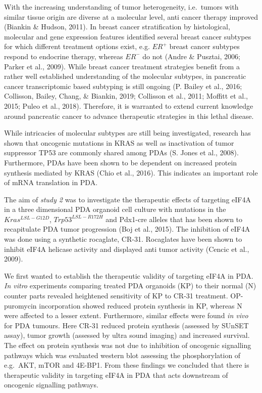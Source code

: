 \documentclass[12pt,openany]{book}
\begin{document}
With the increasing understanding of tumor heterogeneity, i.e.~tumors
with similar tissue origin are diverse at a molecular level, anti cancer
therapy improved (Biankin \& Hudson, 2011). In breast cancer
stratification by histological, molecular and gene expression features
identified several breast cancer subtypes for which different treatment
options exist, e.g. \(ER^+\) breast cancer subtypes respond to endocrine
therapy, whereas \(ER^-\) do not (Andre \& Pusztai, 2006; Parker et al.,
2009). While breast cancer treatment strategies benefit from a rather
well established understanding of the molecular subtypes, in pancreatic
cancer transcriptomic based subtyping is still ongoing (P. Bailey et
al., 2016; Collisson, Bailey, Chang, \& Biankin, 2019; Collisson et al.,
2011; Moffitt et al., 2015; Puleo et al., 2018). Therefore, it is
warranted to extend current knowledge around pancreatic cancer to
advance therapeutic strategies in this lethal disease.

While intricacies of molecular subtypes are still being investigated,
research has shown that oncogenic mutations in KRAS as well as
inactivation of tumor suppressor TP53 are commonly shared among PDAs (S.
Jones et al., 2008). Furthermore, PDAs have been shown to be dependent
on increased protein synthesis mediated by KRAS (Chio et al., 2016).
This indicates an important role of mRNA translation in PDA.

The aim of \emph{study 2} was to investigate the therapeutic effects of
targeting eIF4A in a three dimensional PDA organoid cell culture with
mutations in the \(Kras^{LSL-G12D}\), \(Trp53^{LSL-R172H}\) and Pdx1-cre
alleles that has been shown to recapitulate PDA tumor progression (Boj
et al., 2015). The inhibition of eIF4A was done using a synthetic
rocaglate, CR-31. Rocaglates have been shown to inhibit eIF4A helicase
activity and displayed anti tumor activity (Cencic et al., 2009).

We first wanted to establish the therapeutic validity of targeting eIF4A
in PDA. \emph{In vitro} experiments comparing treated PDA organoids (KP)
to their normal (N) counter parts revealed heightened sensitivity of KP
to CR-31 treatment. OP-puromycin incorporation showed reduced protein
synthesis in KP, whereas N were affected to a lesser extent.
Furthermore, similar effects were found \emph{in vivo} for PDA tumours.
Here CR-31 reduced protein synthesis (assessed by SUnSET assay), tumor
growth (assessed by ultra sound imaging) and increased survival. The
effect on protein synthesis was not due to inhibition of oncogenic
signalling pathways which was evaluated western blot assessing the
phosphorylation of e.g.~AKT, mTOR and 4E-BP1. From these findings we
concluded that there is therapeutic validity in targeting eIF4A in PDA
that acts downstream of oncogenic signalling pathways.
\end{document}
